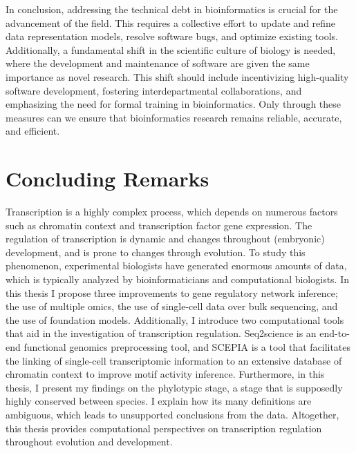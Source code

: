 In conclusion, addressing the technical debt in bioinformatics is crucial for the advancement of the field. This requires a collective effort to update and refine data representation models, resolve software bugs, and optimize existing tools. Additionally, a fundamental shift in the scientific culture of biology is needed, where the development and maintenance of software are given the same importance as novel research. This shift should include incentivizing high-quality software development, fostering interdepartmental collaborations, and emphasizing the need for formal training in bioinformatics. Only through these measures can we ensure that bioinformatics research remains reliable, accurate, and efficient. 

\section{Concluding Remarks}

Transcription is a highly complex process, which depends on numerous factors such as chromatin context and transcription factor gene expression. The regulation of transcription is dynamic and changes throughout (embryonic) development, and is prone to changes through evolution. To study this phenomenon, experimental biologists have generated enormous amounts of data, which is typically analyzed by bioinformaticians and computational biologists. In this thesis I propose three improvements to gene regulatory network inference; the use of multiple omics, the use of single-cell data over bulk sequencing, and the use of foundation models. Additionally, I introduce two computational tools that aid in the investigation of transcription regulation. Seq2science is an end-to-end functional genomics preprocessing tool, and SCEPIA is a tool that facilitates the linking of single-cell transcriptomic information to an extensive database of chromatin context to improve motif activity inference. Furthermore, in this thesis, I present my findings on the phylotypic stage, a stage that is supposedly highly conserved between species. I explain how its many definitions are ambiguous, which leads to unsupported conclusions from the data. Altogether, this thesis provides computational perspectives on transcription regulation throughout evolution and development. 
